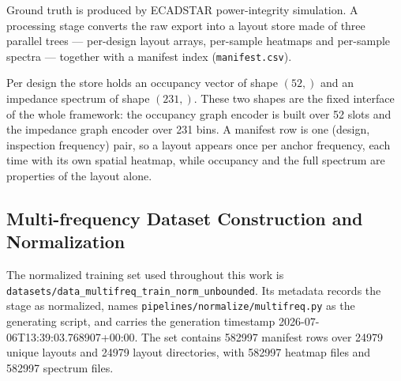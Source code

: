 Ground truth is produced by ECADSTAR power-integrity simulation. A processing stage converts the raw
export into a layout store made of three parallel trees --- per-design layout arrays, per-sample
heatmaps and per-sample spectra --- together with a manifest index (\texttt{manifest.csv}).

Per design the store holds an occupancy vector of shape $(52,)$ and an impedance spectrum of shape
$(231,)$. These two shapes are the fixed interface of the whole framework: the occupancy graph
encoder is built over 52 slots and the impedance graph encoder over 231 bins. A manifest row is one
(design, inspection frequency) pair, so a layout appears once per anchor frequency, each time with
its own spatial heatmap, while occupancy and the full spectrum are properties of the layout alone.




\subsection{Multi-frequency Dataset Construction and Normalization}
\label{subsec:multifreq_dataset}

The normalized training set used throughout this work is
\texttt{datasets/data\_multifreq\_train\_norm\_unbounded}. Its metadata records the stage as
normalized, names \texttt{pipelines/normalize/multifreq.py} as the generating script, and carries the
generation timestamp 2026-07-06T13:39:03.768907+00:00. The set contains 582997 manifest rows over
24979 unique layouts and 24979 layout directories, with 582997 heatmap files and 582997 spectrum
files.

